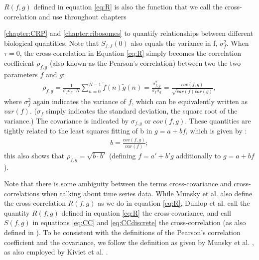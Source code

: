 $R(f,g)$ defined in equation \ref{eq:R} is also the function that we call the cross-correlation and use throughout chapters {\ref{chapter:CRP} and \ref{chapter:ribosomes} to quantify relationships between different biological quantities.
%
Note that $S_{f,f}(0)$ also equals the variance in f, $\sigma^2_f$. 
%
When $\tau=0$, the cross-correlation in Equation \ref{eq:R} simply becomes the correlation coefficient $\rho_{f,g}$ (also known as the Pearson's correlation) between two the two parameters $f$ and $g$:
%
%
\begin{align}
	\label{correlationCoefficient}
	\rho_{f,g}=		
	\frac{1}{\sigma_f \sigma_g \cdot N} 
	\sum_{n=0}^{N-1} {\tilde{f}(n) \tilde{g}(n)}
	=
	\frac{\sigma^2_{f,g}}{\sigma_f \sigma_g}
	=
	\frac{cov(f,g)}{\sqrt{var(f)var(g)}},
\end{align}
where $\sigma^2_f$ again indicates the variance of $f$, which can be equivalently written as $var(f)$. ($\sigma_f$ simply indicates the standard deviation, the square root of the variance.) The covariance is indicated by $\sigma_{f,g}$ or $cov(f,g)$.
%
%
%
These quantities are tightly related to the least squares fitting of b in $g=a+bf$, which is given by \cite[see lemma "Correlation Coefficient"]{Weisstein2018}:
\begin{align}
b = \frac{cov(f,g)}{var(f)};
\end{align}
this also shows that $\rho_{f,g} = \sqrt { b \cdot b' }$ (defining $f=a'+b'g$ additionally to $g=a+bf$).

Note that there is some ambiguity between the terms cross-covariance and cross-correlations when talking about time series data. 
While Munsky et al. \cite{Munsky2012} also define the cross-correlation $R(f,g)$ as we do in equation \ref{eq:R}, Dunlop et al. \cite{Dunlop2008} call the quantity $R(f,g)$ defined in equation \ref{eq:R} the cross-covariance, and call $S(f,g)$ in equations \ref{eq:CC} and \ref{eq:CCdiscrete} the cross-correlation (as also defined in \cite[see lemma "Cross-Correlation"]{Weisstein2018}). To be consistent with the definitions of the Pearson's correlation coefficient and the covariance, we follow the definition as given by Munsky et al. \cite{Munsky2012}, as also employed by Kiviet et al. \cite{Kiviet2010, Kiviet2014}.



}
